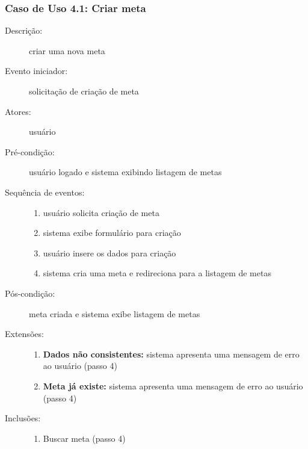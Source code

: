 \subsubsection{Caso de Uso 4.1: Criar meta}
\begin{description}
	\item[Descrição:] criar uma nova meta
	\item[Evento iniciador:] solicitação de criação de meta
	\item[Atores:] usuário
	\item[Pré-condição:] usuário logado e sistema exibindo listagem de metas
	\item[Sequência de eventos:] \hfill
		\begin{enumerate}
			\item{usuário solicita criação de meta}
			\item{sistema exibe formulário para criação}
			\item{usuário insere os dados para criação}
			\item{sistema cria uma meta e redireciona para a listagem de metas}
		\end{enumerate}
	\item[Pós-condição:] meta criada e sistema exibe listagem de metas
	\item[Extensões:] \hfill
		\begin{enumerate}
			\item{\textbf{Dados não consistentes:} sistema apresenta uma mensagem de erro ao usuário (passo 4)}
			\item{\textbf{Meta já existe:} sistema apresenta uma mensagem de erro ao usuário (passo 4)}
		\end{enumerate}
	\item[Inclusões:] \hfill
		\begin{enumerate}
			\item{Buscar meta (passo 4)}
		\end{enumerate}
\end{description}
%
